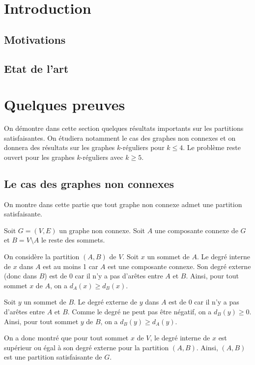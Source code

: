 \section{Introduction}\label{sec:s_1}

\subsection{Motivations}\label{subsec:ss1_1}


\subsection{Etat de l'art}\label{subsec:ss1_2}


\section{Quelques preuves}\label{sec:s_2}

On démontre dans cette section quelques résultats importants sur les partitions satisfaisantes.
On étudiera notamment le cas des graphes non connexes et on donnera des résultats sur les graphes \(k\)-réguliers pour \(k \leq 4\).
Le problème reste ouvert pour les graphes \(k\)-réguliers avec \(k \geq 5\).

\subsection{Le cas des graphes non connexes}\label{subsec:ss2_1}

On montre dans cette partie que tout graphe non connexe admet une partition satisfaisante.

Soit \(G = (V, E)\) un graphe non connexe.
Soit \(A\) une composante connexe de \(G\) et \(B = V \setminus A\) le reste des sommets.

On considère la partition \((A, B)\) de \(V\).
Soit \(x\) un sommet de \(A\). Le degré interne de \(x\) dans \(A\) est au moins 1 car \(A\) est une composante connexe.
Son degré externe (donc dans \(B\)) est de 0 car il n'y a pas d'arêtes entre \(A\) et \(B\).
Ainsi, pour tout sommet \(x\) de \(A\), on a \(d_A(x) \geq d_B(x)\).

Soit \(y\) un sommet de \(B\). Le degré externe de \(y\) dans \(A\) est de 0 car il n'y a pas d'arêtes entre \(A\) et \(B\).
Comme le degré ne peut pas être négatif, on a \(d_B(y) \geq 0\).
Ainsi, pour tout sommet \(y\) de \(B\), on a \(d_B(y) \geq d_A(y)\).

On a donc montré que pour tout sommet \(x\) de \(V\), le degré interne de \(x\) est supérieur ou égal à son degré externe pour la partition \((A, B)\).
Ainsi, \((A, B)\) est une partition satisfaisante de \(G\).

